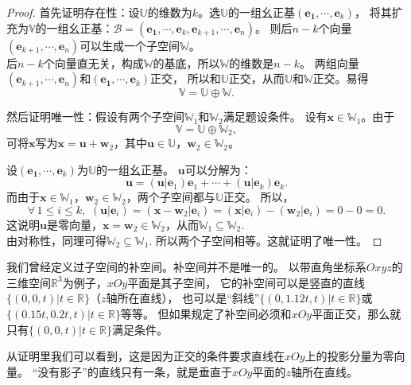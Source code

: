 \documentclass[12pt,UTF8]{ctexbook}
\begin{document}
\begin{proof} %
    首先证明存在性：设$\mathbb{U}$的维数为$k$。选$\mathbb{U}$的一组幺正基$(\mathbf{e_1}, \cdots, \mathbf{e}_k)$，
    将其扩充为$\mathbb{V}$的一组幺正基：$\mathcal{B} = (\mathbf{e_1}, \cdots, \mathbf{e}_k, \mathbf{e}_{k+1}, \cdots , \mathbf{e}_n)$。
    则后$n-k$个向量$(\mathbf{e}_{k+1}, \cdots , \mathbf{e}_n)$可以生成一个子空间$\mathbb{W}$。\\
    后$n-k$个向量直无关，构成$\mathbb{W}$的基底，所以$\mathbb{W}$的维数是$n-k$。
    两组向量$(\mathbf{e}_{k+1}, \cdots , \mathbf{e}_n)$和$(\mathbf{e_1}, \cdots, \mathbf{e}_k)$正交，
    所以和$\mathbb{U}$正交，从而$\mathbb{U}$和$\mathbb{W}$正交。易得
    $$ \mathbb{V} = \mathbb{U} \oplus \mathbb{W}.$$

    然后证明唯一性：假设有两个子空间$\mathbb{W}_1$和$\mathbb{W}_2$满足题设条件。
    设有$\mathbf{x} \in \mathbb{W}_1$。由于
    $$ \mathbb{V} = \mathbb{U} \oplus \mathbb{W}_2,$$
    可将$\mathbf{x}$写为$\mathbf{x} = \mathbf{u} + \mathbf{w}_2$，其中$\mathbf{u} \in \mathbb{U}$，$\mathbf{w}_2 \in \mathbb{W}_2$。

    设$(\mathbf{e_1}, \cdots, \mathbf{e}_k)$为$\mathbb{U}$的一组幺正基。
    $\mathbf{u}$可以分解为：
    $$ \mathbf{u} = (\mathbf{u}|\mathbf{e}_1)\mathbf{e}_1 + \cdots + (\mathbf{u}|\mathbf{e}_k)\mathbf{e}_k.$$
    而由于$\mathbf{x} \in\mathbb{W}_1$，$\mathbf{w}_2 \in\mathbb{W}_2$，两个子空间都与$\mathbb{U}$正交。
    所以，
    $$ \forall \, 1 \leqslant i \leqslant k, \,\, (\mathbf{u}|\mathbf{e}_i) = (\mathbf{x} - \mathbf{w}_2|\mathbf{e}_i) = (\mathbf{x}|\mathbf{e}_i) - (\mathbf{w}_2|\mathbf{e}_i) = 0 - 0 = 0.$$
    这说明$\mathbf{u}$是零向量，$\mathbf{x} = \mathbf{w}_2 \in \mathbb{W}_2$，从而$\mathbb{W}_1 \subseteq \mathbb{W}_2$.\\
    由对称性，同理可得$\mathbb{W}_2 \subseteq \mathbb{W}_1$. 所以两个子空间相等。这就证明了唯一性。

\end{proof}


我们曾经定义过子空间的补空间。补空间并不是唯一的。
以带直角坐标系$Oxyz$的三维空间$\mathbb{R}^3$为例子，$xOy$平面是其子空间，
它的补空间可以是竖直的直线$\{(0,0,t) | t \in \mathbb{R}\}$（$z$轴所在直线），
也可以是“斜线”$\{(0,1.12t,t) | t \in \mathbb{R}\}$或$\{(0.15t,0.2t,t) | t \in \mathbb{R}\}$等等。
但如果规定了补空间必须和$xOy$平面正交，那么就只有$\{(0,0,t) | t \in \mathbb{R}\}$满足条件。

从证明里我们可以看到，这是因为正交的条件要求直线在$xOy$上的投影分量为零向量。
“没有影子”的直线只有一条，就是垂直于$xOy$平面的$z$轴所在直线。
\end{document}
